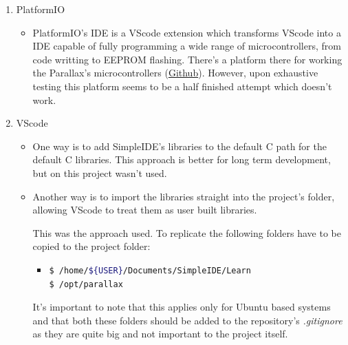 \documentclass[sigconf,nonacm]{acmart}
\begin{document}
      \begin{enumerate}
            \item PlatformIO
                  \begin{itemize}
                        \item PlatformIO's IDE is a VScode
                        extension which transforms VScode into a IDE capable of
                        fully programming a wide range of microcontrollers, from
                        code writting to EEPROM flashing. There's a platform
                        there for working the Parallax's
                        microcontrollers (\href{https://github.com/msquirogac/platform-propeller}{Github}).
                        However, upon exhaustive testing this platform seems to
                        be a half finished attempt which doesn't work.
                  \end{itemize}
            \item VScode
                  \begin{itemize}
                        \item One way is to add SimpleIDE's libraries to the
                        default C path for the default C libraries. This
                        approach is better for long term development, but on
                        this project wasn't used.

                        \item Another way is to import the libraries straight
                        into the project's folder, allowing VScode to treat them
                        as user built libraries.
                        
                        This was the approach used. To replicate the following
                        folders have to be copied to the project folder:
                        \begin{itemize}
                              \item \begin{lstlisting}[language=bash]
$ /home/${USER}/Documents/SimpleIDE/Learn
$ /opt/parallax
                                    \end{lstlisting}
                              \end{itemize}
                              It's important to note that this applies only for Ubuntu
                                    based systems and that both these folders should be
                                    added to the repository's \textit{.gitignore} as they
                                    are quite big and not important to the project itself.
                  \end{itemize}
      \end{enumerate}
\end{document}
